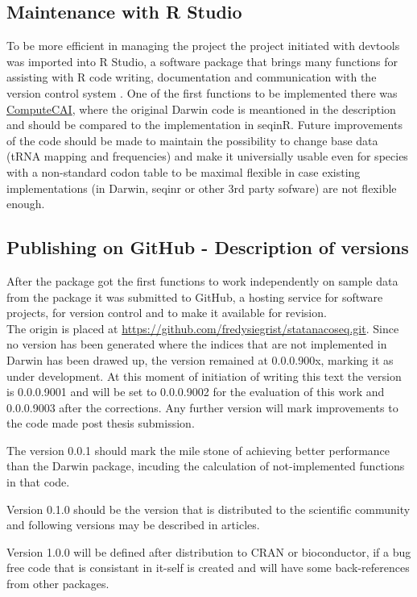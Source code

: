 \subsection{Maintenance with R Studio}
To be more efficient in managing the project the project initiated with devtools was imported into R Studio, a software package that brings many functions for assisting with R code writing, documentation and communication with the version control system \cite{Rstudio2015}. One of the first functions to be implemented there was \hyperlink{function:CAI}{ComputeCAI}, where the original Darwin code is meantioned in the description and should be compared to the implementation in seqinR. Future improvements of the code should be made to maintain the possibility to change base data (tRNA mapping and frequencies) and make it universially usable even for species with a non-standard codon table to be maximal flexible in case existing implementations (in Darwin, seqinr or other 3rd party sofware) are not flexible enough.

\subsection{Publishing on GitHub - Description of versions}
After the package got the first functions to work independently on sample data from the package it was submitted to GitHub, a hosting service for software projects, for version control and to make it available for revision. \\
The origin is placed at \href{https://github.com/fredysiegrist/statanacoseq.git}{https://github.com/fredysiegrist/statanacoseq.git}. Since no version has been generated where the indices that are not implemented in Darwin has been drawed up, the version remained at 0.0.0.900x, marking it as under development. At this moment of initiation of writing this text the version is 0.0.0.9001 and will be set to 0.0.0.9002 for the evaluation of this work and 0.0.0.9003 after the corrections. Any further version will mark improvements to the code made post thesis submission.

The version 0.0.1 should mark the mile stone of achieving better performance than the Darwin package, incuding the calculation of not-implemented functions in that code.

Version 0.1.0 should be the version that is distributed to the scientific community and following versions may be described in articles.

Version 1.0.0 will be defined after distribution to CRAN or bioconductor, if a bug free code that is consistant in it-self is created and will have some back-references from other packages.